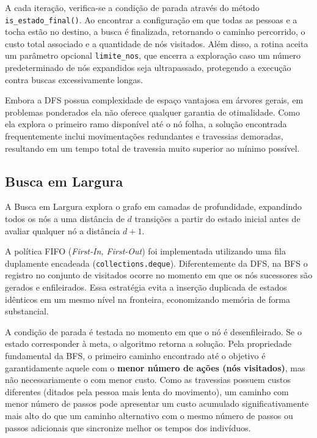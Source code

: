\documentclass[12pt,a4paper]{article}
\begin{document}
A cada iteração, verifica-se a condição de parada através do método 
\texttt{is\_estado\_final()}. Ao encontrar a configuração em que todas as pessoas e a 
tocha estão no destino, a busca é finalizada, retornando o 
caminho percorrido, o custo total associado e a quantidade de nós visitados. Além disso, 
a rotina aceita um parâmetro opcional \texttt{limite\_nos}, que encerra a exploração 
caso um número predeterminado de nós expandidos seja ultrapassado, protegendo a execução 
contra buscas excessivamente longas.

Embora a DFS possua complexidade de espaço vantajosa em árvores gerais, em problemas 
ponderados ela não oferece qualquer garantia de otimalidade. Como ela explora o 
primeiro ramo disponível até o nó folha, a solução encontrada frequentemente inclui 
movimentações redundantes e travessias demoradas, resultando em um tempo total de 
travessia muito superior ao mínimo possível.

\subsection{Busca em Largura}
\label{subsec:bfs}

A Busca em Largura explora o grafo em camadas de profundidade, expandindo 
todos os nós a uma distância de $d$ transições a partir do estado inicial antes de 
avaliar qualquer nó a distância $d+1$.

A política FIFO (\textit{First-In, First-Out}) foi implementada utilizando uma fila 
duplamente encadeada (\texttt{collections.deque}). Diferentemente da DFS, na BFS o 
registro no conjunto de visitados ocorre no momento em que os nós sucessores são gerados 
e enfileirados. Essa estratégia evita a inserção duplicada de estados idênticos em um 
mesmo nível na fronteira, economizando memória de forma substancial.

A condição de parada é testada no momento em que o nó é desenfileirado. Se o estado 
corresponder à meta, o algoritmo retorna a solução. Pela propriedade fundamental da BFS, 
o primeiro caminho encontrado até o objetivo é garantidamente aquele com o 
\textbf{menor número de ações (nós visitados)}, mas não necessariamente o com menor custo.
Como as travessias possuem custos diferentes (ditados pela pessoa 
mais lenta do movimento), um caminho com menor número de passos pode apresentar um custo 
acumulado significativamente mais alto do que um caminho alternativo com o mesmo número 
de passos ou passos adicionais que sincronize melhor os tempos dos indivíduos.
\end{document}
